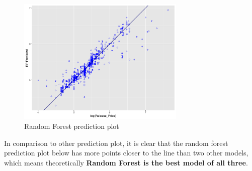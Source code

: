 \documentclass[a4paper]{article}
\theoremstyle{definition}
\begin{document}
\begin{figure}[h!]
\begin{center}
\includegraphics[width=8cm]{images/scatter_rfr.png}
\end{center}
\caption{Random Forest prediction plot}
\end{figure}
In comparison to other prediction plot, it is clear that the random forest prediction plot below has more points closer to the line than two other models, which means theoretically \textbf{Random Forest is the best model of all three}.
\pagebreak
\end{document}
